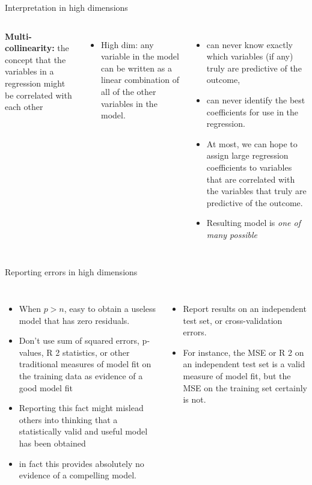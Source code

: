 \documentclass[aspectratio=169,usenames,dvipsnames]{beamer}
\newcommand{\InstructorList}[1]{
\begin{itemize}
	\color{orange}
	#1
\end{itemize}
}
\begin{document}
\begin{frame}[t]{Interpretation in high dimensions}

\begin{columns}
\centering
\textbf{Multi-collinearity:} the concept that the variables in a regression might be correlated with each other


\InstructorList{
\item High dim: any variable in the model can be written as a linear combination of all of the other variables in the model.
}



\centering
\InstructorList{

	\item can never know exactly which variables (if any) truly are predictive of the outcome,
	\item can never identify the best coeﬃcients
for use in the regression.
\item  At most, we can hope to assign large regression
coefficients to variables that are correlated with the variables that truly are
predictive of the outcome.
\item Resulting model is \textit{one of many possible}
}
\end{columns}

\end{frame}
\begin{frame}[t]{Reporting errors in high dimensions}

\begin{columns}
\centering

\InstructorList{
  \item When $p>n$, easy to obtain a useless model that has zero residuals.
	\item Don't use sum of squared errors, p-values, R 2
statistics, or other traditional measures of model fit on the training data as evidence of a good model fit
\item Reporting this fact might mislead others into thinking that a statistically valid and useful model has been obtained
\item in fact this provides absolutely no evidence of a compelling model.
}

\centering

\InstructorList{
  \item Report results on an independent test set, or cross-validation errors.
	\item 	For instance, the MSE or R 2 on an independent test set is a valid measure
	of model fit, but the MSE on the training set certainly is not.
}

\end{columns}

\end{frame}
\end{document}

